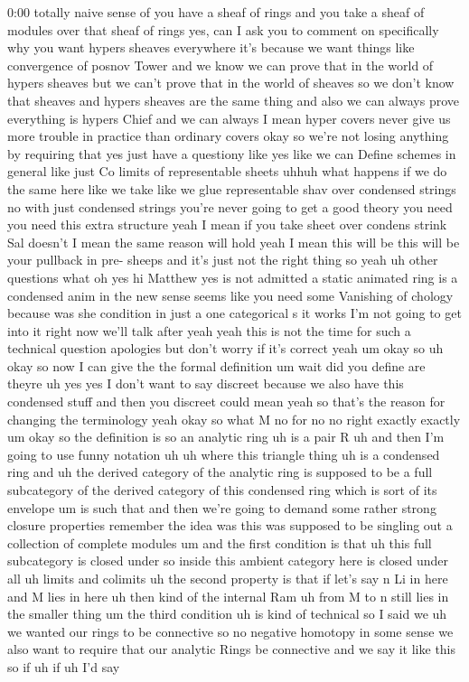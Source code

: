 \begin{unfinished}{0:00}
totally naive sense of you have a sheaf of rings and you take a sheaf of modules over that sheaf of rings yes, can I ask you to comment on specifically why you want hypers sheaves everywhere it's because we want things like convergence of posnov Tower and we know we can prove that in the world of hypers sheaves but we can't prove that in the world of sheaves so we don't know that sheaves and hypers sheaves are the same thing and also we can always prove everything is hypers Chief and we can always I mean hyper covers never give us more trouble in practice than ordinary covers okay so we're not losing anything by requiring that yes just have a questiony like yes like we can Define schemes in general like just Co limits of representable sheets uhhuh what happens if we do the same here like we take like we glue representable shav over condensed strings no with just condensed strings you're never going to get a good theory you need you need this extra structure yeah I mean if you take sheet over condens strink Sal doesn't I mean the same reason will hold yeah I mean this will be this will be your pullback in pre- sheeps and it's just not the right thing so yeah uh other questions what oh yes hi Matthew yes is not admitted a static animated ring is a condensed anim in the new sense seems like you need some Vanishing of chology because was she condition in just a one categorical s it works I'm not going to get into it right now we'll talk after yeah yeah this is not the time for such a technical question apologies but don't worry if it's correct yeah um okay so uh okay so now I can give the the formal definition um wait did you define are theyre uh yes yes I don't want to say discreet because we also have this condensed stuff and then you discreet could mean yeah so that's the reason for changing the terminology yeah okay so what M no for no no right exactly exactly um okay so the definition is so an analytic ring uh is a pair R uh and then I'm going to use funny notation uh uh where this triangle thing uh is a condensed ring and uh the derived category of the analytic ring is supposed to be a full subcategory of the derived category of this condensed ring which is sort of its envelope um is such that and then we're going to demand some rather strong closure properties remember the idea was this was supposed to be singling out a collection of complete modules um and the first condition is that uh this full subcategory is closed under so inside this ambient category here is closed under all uh limits and colimits uh the second property is that if let's say n Li in here and M lies in here uh then kind of the internal Ram uh from M to n still lies in the smaller thing um the third condition uh is kind of technical so I said we uh we wanted our rings to be connective so no negative homotopy in some sense we also want to require that our analytic Rings be connective and we say it like this so if uh if uh I'd say


\end{unfinished}
